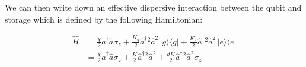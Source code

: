 We can then write down an effective dispersive interaction between the qubit and storage which is defined by the following Hamiltonian:

\begin{align*}
\hat{H} &= \frac{\chi}{2} \hat{a}^\dagger\hat{a} \sigma_z + \frac{K_g}{2} \hat{a}^\dagger{}^2\hat{a}^2 \,|g\rangle\langle g| + \frac{K_e}{2} \hat{a}^\dagger{}^2\hat{a}^2 \,|e\rangle\langle e| \\
&= \frac{\chi}{2} \hat{a}^\dagger\hat{a} \sigma_z + \frac{K}{2} \hat{a}^\dagger{}^2\hat{a}^2 + \frac{dK}{2}\hat{a}^\dagger{}^2\hat{a}^2 \sigma_z
\end{align*}

